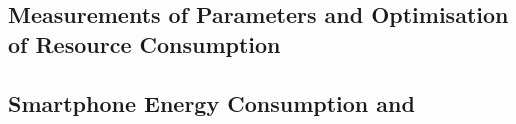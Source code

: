 \subsection{Measurements of  Parameters and Optimisation of Resource Consumption}\label{sec:network:background:measurement_optimisation}

\subsection{Smartphone Energy Consumption and }\label{sec:network:background:energy_consumption_qoe}
